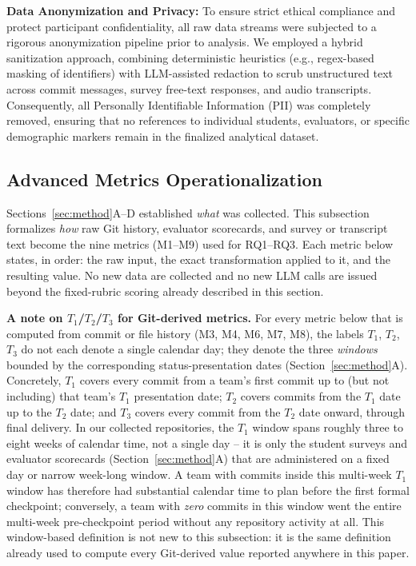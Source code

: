 \documentclass[conference]{IEEEtran}
\begin{document}
\textbf{Data Anonymization and Privacy:} To ensure strict ethical compliance and protect participant confidentiality, all raw data streams were subjected to a rigorous anonymization pipeline prior to analysis. We employed a hybrid sanitization approach, combining deterministic heuristics (e.g., regex-based masking of identifiers) with LLM-assisted redaction to scrub unstructured text across commit messages, survey free-text responses, and audio transcripts. Consequently, all Personally Identifiable Information (PII) was completely removed, ensuring that no references to individual students, evaluators, or specific demographic markers remain in the finalized analytical dataset.

\subsection{Advanced Metrics Operationalization}
\label{sec:advanced-metrics}

Sections~\ref{sec:method}A--D established \emph{what} was collected. This
subsection formalizes \emph{how} raw Git history, evaluator scorecards, and
survey or transcript text become the nine metrics (M1--M9) used for
RQ1--RQ3. Each metric below states, in order: the raw input, the exact
transformation applied to it, and the resulting value. No new data are
collected and no new LLM calls are issued beyond the fixed-rubric scoring
already described in this section.

\textbf{A note on $T_1$/$T_2$/$T_3$ for Git-derived metrics.} For every
metric below that is computed from commit or file history (M3, M4, M6, M7,
M8), the labels $T_1$, $T_2$, $T_3$ do not each denote a single calendar
day; they denote the three \emph{windows} bounded by the corresponding
status-presentation dates (Section~\ref{sec:method}A). Concretely, $T_1$
covers every commit from a team's first commit up to (but not including)
that team's $T_1$ presentation date; $T_2$ covers commits from the $T_1$
date up to the $T_2$ date; and $T_3$ covers every commit from the $T_2$
date onward, through final delivery. In our collected repositories, the
$T_1$ window spans roughly three to eight weeks of calendar time, not a
single day -- it is only the student surveys and evaluator scorecards
(Section~\ref{sec:method}A) that are administered on a fixed day or
narrow week-long window. A team with commits inside this multi-week $T_1$
window has therefore had substantial calendar time to plan before the
first formal checkpoint; conversely, a team with \emph{zero} commits in
this window went the entire multi-week pre-checkpoint period without any
repository activity at all. This window-based definition is not new to
this subsection: it is the same definition already used to compute every
Git-derived value reported anywhere in this paper.
\end{document}
